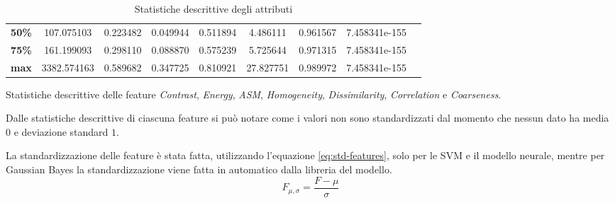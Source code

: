 \begin{table}[h!]
\begin{subtable}[h]{1\textwidth}
{\begin{tabular}{c|c c c c c c c c}
                        \textbf{50\%}                                             & 107.075103        & 0.223482        & 0.049944     & 0.511894             & 4.486111               & 0.961567             & 7.458341e-155       \\
                        \textbf{75\%}                                             & 161.199093        & 0.298110        & 0.088870     & 0.575239             & 5.725644               & 0.971315             & 7.458341e-155       \\
                        \textbf{max}                                              & 3382.574163       & 0.589682        & 0.347725     & 0.810921             & 27.827751              & 0.989972             & 7.458341e-155       \\ \hline
                  \end{tabular}}
            \caption{Statistiche descrittive delle feature \textit{Contrast}, \textit{Energy}, \textit{ASM}, \textit{Homogeneity}, \textit{Dissimilarity}, \textit{Correlation} e \textit{Coarseness}.}
            \label{tab:secondameta}
      \end{subtable}
      \caption{Statistiche descrittive degli attributi}
      \label{tab:desc-stat}
\end{table}

Dalle statistiche descrittive di ciascuna feature si può notare come i valori non
sono standardizzati dal momento che nessun dato ha media $0$ e deviazione
standard $1$.

La standardizzazione delle feature è stata fatta, utilizzando l'equazione
\ref{eq:std-features}, solo per le SVM e il modello neurale, mentre per Gaussian
Bayes la standardizzazione viene fatta in automatico dalla libreria del modello.
\begin{equation}
      F_{\mu, \sigma} = \frac{F - \mu}{\sigma}
      \label{eq:std-features}
\end{equation}

